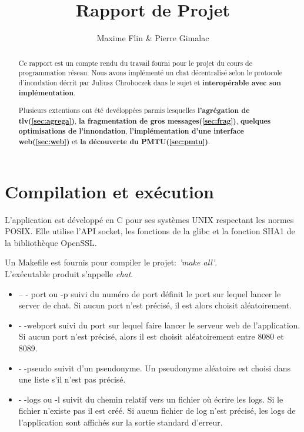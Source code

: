 \documentclass[a4paper,10pt]{article} %
\author{Maxime Flin \& Pierre Gimalac}
\title{Rapport de Projet}
\begin{document}
\maketitle

\begin{abstract}
  Ce rapport est un compte rendu du travail fourni pour le projet du cours de programmation réseau. Nous avons implémenté un chat décentralisé selon le protocole d'inondation décrit par Juliusz Chroboczek dans le sujet et \textbf{interopérable avec son implémentation}.

  Plusieurs extentions ont été devéloppées parmis lesquelles \textbf{l'agrégation de tlv(\ref{sec:agrega})}, \textbf{la fragmentation de gros messages(\ref{sec:frag})}, \textbf{quelques optimisations de l'innondation}, \textbf{l'implémentation d'une interface web(\ref{sec:web})} et \textbf{la découverte du PMTU(\ref{sec:pmtu})}.
\end{abstract}

\section{Compilation et exécution\label{sec:exec}}
L'application est développé en C pour ses systèmes UNIX respectant les normes POSIX. Elle utilise l'API socket, les fonctions de la \textrm{glibc} et la fonction \textrm{SHA1} de la bibliothèque \textrm{OpenSSL}.

Un \textrm{Makefile} est fournis pour compiler le projet:  \textit{'make all'}.\\

L'exécutable produit s'appelle \textit{chat}.
\begin{itemize}
\item \textrm{-- - port} ou \textrm{-p} suivi du numéro de port définit le port sur lequel lancer le server de chat. Si aucun port n'est précisé, il est alors choisit aléatoirement.
\item \textrm{- -webport} suivi du port sur lequel faire lancer le serveur web de l'application. Si aucun port n'est précisé, alors il est choisit aléatoirement entre 8080 et 8089.
\item \textrm{- -pseudo} suivit d'un pseudonyme. Un pseudonyme aléatoire est choisi dans une liste s'il n'est pas précisé.
\item \textrm{- -logs} ou \textrm{-l} suivit du chemin relatif vers un fichier où écrire les logs. Si le fichier n'existe pas il est créé. Si aucun fichier de log n'est précisé, les logs de l'application sont affichés sur la sortie standard d'erreur.
\end{itemize}
\end{document}
